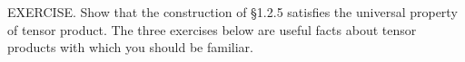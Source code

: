 EXERCISE. Show that the construction of §1.2.5 satisfies the universal property of tensor product. The three exercises below are useful facts about tensor products with which you should be familiar.
